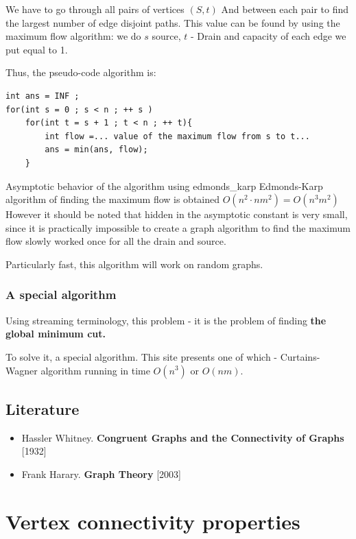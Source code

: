 We have to go through all pairs of vertices $(S, t)$ And between each pair to find the largest number of edge disjoint paths. This value can be found by using the maximum flow algorithm: we do $s$ source, $t$ - Drain and capacity of each edge we put equal to 1.

Thus, the pseudo-code algorithm is:

\begin{verbatim}
int ans = INF ;
for(int s = 0 ; s < n ; ++ s )
    for(int t = s + 1 ; t < n ; ++ t){
        int flow =... value of the maximum flow from s to t...
        ans = min(ans, flow);
    } 
\end{verbatim}
Asymptotic behavior of the algorithm using edmonds\_karp {Edmonds-Karp algorithm of finding the maximum flow is obtained} $O (n ^ 2 \cdot n m ^ 2) = O (n ^ 3 m ^ 2)$ However it should be noted that hidden in the asymptotic constant is very small, since it is practically impossible to create a graph algorithm to find the maximum flow slowly worked once for all the drain and source.

Particularly fast, this algorithm will work on random graphs.

\subsubsection{ A special algorithm }

Using streaming terminology, this problem - it is the problem of finding \textbf{the global minimum cut.}

To solve it, a special algorithm. This site presents one of which - Curtains-Wagner algorithm running in time $O (n ^ 3)$ or $O (n m)$.

\subsection{ Literature }

\begin{itemize}

\item Hassler Whitney. \textbf{Congruent Graphs and the Connectivity of Graphs} [1932]

\item Frank Harary. \textbf{Graph Theory} [2003]

\end{itemize}

\section{ Vertex connectivity properties }
